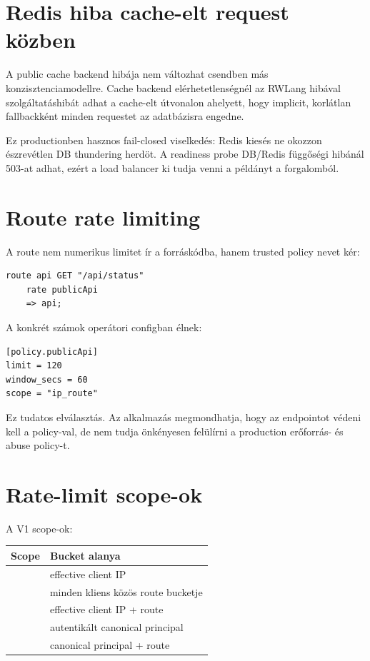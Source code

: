 \section{Redis hiba cache-elt request közben}

A public cache backend hibája nem változhat csendben más konzisztenciamodellre. Cache backend elérhetetlenségnél az RWLang  hibával szolgáltatáshibát adhat a cache-elt útvonalon ahelyett, hogy implicit, korlátlan fallbackként minden requestet az adatbázisra engedne.

Ez productionben hasznos fail-closed viselkedés: Redis kiesés ne okozzon észrevétlen DB thundering herdöt. A readiness probe DB/Redis függőségi hibánál 503-at adhat, ezért a load balancer ki tudja venni a példányt a forgalomból.

\section{Route rate limiting}

A route nem numerikus limitet ír a forráskódba, hanem trusted policy nevet kér:

\begin{lstlisting}[language=RWLang]
route api GET "/api/status"
    rate publicApi
    => api;
\end{lstlisting}

A konkrét számok operátori configban élnek:

\begin{lstlisting}
[policy.publicApi]
limit = 120
window_secs = 60
scope = "ip_route"
\end{lstlisting}

Ez tudatos elválasztás. Az alkalmazás megmondhatja, hogy az endpointot védeni kell a  policy-val, de nem tudja önkényesen felülírni a production erőforrás- és abuse policy-t.

\section{Rate-limit scope-ok}

A V1 scope-ok:

\begin{center}
\begin{tabularx}{\textwidth}{@{}L{0.22\textwidth}Y@{}}
\toprule
\textbf{Scope} & \textbf{Bucket alanya} \\
\midrule
{} & effective client IP \\
 & minden kliens közös route bucketje \\
 & effective client IP + route \\
 & autentikált canonical principal \\
 & canonical principal + route \\
\bottomrule
\end{tabularx}
\end{center}

